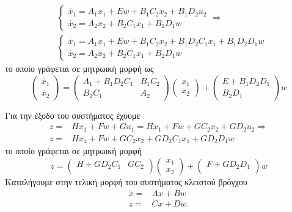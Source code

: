 \begin{align*}
    &
    \begin{cases}
        \dot{x_1} = A_1 x_1 + E w + B_1 C_2 x_2 + B_1 D_2 u_2\\
        \dot{x_2} = A_2 x_2 + B_2 C_1 x_1 + B_2 D_1 w 
    \end{cases}\Rightarrow\\
    &
    \begin{cases}
        \dot{x_1} = A_1 x_1 + E w + B_1 C_2 x_2 + B_1 D_2 C_1 x_1 + B_1 D_2 D_1 w\\
        \dot{x_2} = A_2 x_2 + B_2 C_1 x_1 + B_2 D_1 w
    \end{cases}    
\end{align*}
το οποίο γράφεται σε μητρωική μορφή ως
\begin{equation*}
    \begin{pmatrix}
        \dot{x_1} \\
        \dot{x_2}
    \end{pmatrix}=
    \begin{pmatrix}
        A_1 + B_1 D_2 C_1 & B_1 C_2 \\
        B_2 C_1 & A_2 
    \end{pmatrix}
    \begin{pmatrix}
        x_1 \\
        x_2
    \end{pmatrix}
    +
    \begin{pmatrix}
        E + B_1 D_2 D_1 \\
        B_2 D_1
    \end{pmatrix} w
\end{equation*}

Για την έξοδο του συστήματος έχουμε
\begin{align*}
    z =& H x_1 + Fw + G u_1 = H x_1 + Fw + G C_2 x_2 + G D_2 u_2 \Rightarrow \\
    z =& H x_1 + Fw + G C_2 x_2 + G D_2 C_1 x_1 + G D_2 D_1 w 
\end{align*}
το οποίο γράφεται σε μητρωική μορφή
\begin{equation*}
    z =
    \begin{pmatrix}
        H+G D_2 C_1 & G C_2 \\
    \end{pmatrix}
    \begin{pmatrix}
        x_1 \\
        x_2
    \end{pmatrix}
    +
    \begin{pmatrix}
        F + G D_2 D_1 \\
    \end{pmatrix} w
\end{equation*}
Καταλήγουμε στην τελική μορφή του συστήματος κλειστού βρόγχου
\begin{align*}
    \dot{x} =& Ax + Bw \\
    z =& Cx + Dw.
\end{align*}


